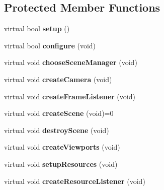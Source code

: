 \subsection*{Protected Member Functions}
\begin{DoxyCompactItemize}
\item 
\mbox{\label{class_base_application_a5853d0e148cb85b0297a6885e1d33a89}} 
virtual bool {\bfseries setup} ()
\item 
\mbox{\label{class_base_application_a62ed46f90e9f82cc810997647a2c587e}} 
virtual bool {\bfseries configure} (void)
\item 
\mbox{\label{class_base_application_ad5bc9655041e1849a4c13f444a3712bd}} 
virtual void {\bfseries choose\+Scene\+Manager} (void)
\item 
\mbox{\label{class_base_application_afa9d51527763cf9aee9cd4e1b1039d55}} 
virtual void {\bfseries create\+Camera} (void)
\item 
\mbox{\label{class_base_application_aff6fd9ff1ff0978cc68f19dd65be4778}} 
virtual void {\bfseries create\+Frame\+Listener} (void)
\item 
\mbox{\label{class_base_application_aa97beeb4059b17d0ec22eae33286ec2d}} 
virtual void {\bfseries create\+Scene} (void)=0
\item 
\mbox{\label{class_base_application_a365146059b25391fe400f5fdb94f011e}} 
virtual void {\bfseries destroy\+Scene} (void)
\item 
\mbox{\label{class_base_application_a1f8f6730cae6ec769d8730b1af48486e}} 
virtual void {\bfseries create\+Viewports} (void)
\item 
\mbox{\label{class_base_application_ae27301702f1e5de64619a39b1929f1f9}} 
virtual void {\bfseries setup\+Resources} (void)
\item 
\mbox{\label{class_base_application_a9b77972f0f747a61e1f8ceba2ad47641}} 
virtual void {\bfseries create\+Resource\+Listener} (void)

\end{DoxyCompactItemize}
